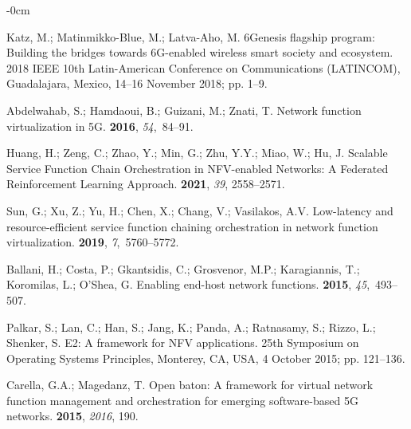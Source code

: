 \documentclass[futureinternet,review,accept,pdftex,moreauthors]{Definitions/mdpi}
\begin{document}
\begin{adjustwidth}{-\extralength}{0cm}
\begin{thebibliography}{999}
Katz, M.; Matinmikko-Blue, M.; Latva-Aho, M.
\newblock 6Genesis flagship program: Building the bridges towards 6G-enabled
  wireless smart society and ecosystem.
  2018 IEEE 10th Latin-American Conference on Communications
  (LATINCOM),  Guadalajara, Mexico, 14--16 November 2018; pp. 1--9.

Abdelwahab, S.; Hamdaoui, B.; Guizani, M.; Znati, T.
\newblock Network function virtualization in 5G.
 {\bf 2016}, {\em 54},~84--91.

Huang, H.; Zeng, C.; Zhao, Y.; Min, G.; Zhu, Y.Y.; Miao, W.; Hu, J.
\newblock Scalable Service Function Chain Orchestration in NFV-enabled
  Networks: A Federated Reinforcement Learning Approach.
 {\bf 2021}, \emph{39}, 2558--2571.

Sun, G.; Xu, Z.; Yu, H.; Chen, X.; Chang, V.; Vasilakos, A.V.
\newblock Low-latency and resource-efficient service function chaining
  orchestration in network function virtualization.
 {\bf 2019}, {\em
  7},~5760--5772.

Ballani, H.; Costa, P.; Gkantsidis, C.; Grosvenor, M.P.; Karagiannis, T.;
  Koromilas, L.; O'Shea, G.
\newblock Enabling end-host network functions.
 {\bf 2015}, {\em
  45},~493--507.

Palkar, S.; Lan, C.; Han, S.; Jang, K.; Panda, A.; Ratnasamy, S.; Rizzo, L.;
  Shenker, S.
\newblock E2: A framework for NFV applications.
 25th Symposium on Operating Systems Principles, Monterey, CA, USA, 4 October 2015; pp. 121--136.

Carella, G.A.; Magedanz, T.
\newblock Open baton: A framework for virtual network function management and
  orchestration for emerging software-based 5G networks.
 {\bf 2015}, {\em 2016}, 190.


\end{thebibliography}
\end{adjustwidth}
\end{document}
